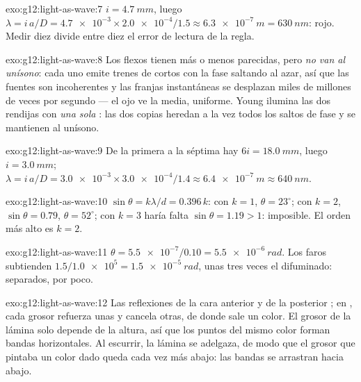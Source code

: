 \begin{solution}{exo:g12:light-as-wave:7}
$i = \qty{4.7}{mm}$, luego
$\lambda = i\,a/D = \num{4.7e-3} \times \num{2.0e-4}/1.5 \approx
\qty{6.3e-7}{m} = \qty{630}{nm}$: rojo. Medir diez  divide
entre diez el error de lectura de la regla.
\end{solution}

\begin{solution}{exo:g12:light-as-wave:8}
Los flexos tienen  más o menos parecidas, pero \emph{no van
al unísono}: cada uno emite trenes de  cortos con la fase saltando
al azar, así que las fuentes son incoherentes y las franjas instantáneas
se desplazan miles de millones de veces por segundo --- el ojo ve la
media, uniforme. Young ilumina las dos rendijas con \emph{una sola}
: las dos copias heredan a la vez todos los saltos de fase y se
mantienen al unísono.
\end{solution}

\begin{solution}{exo:g12:light-as-wave:9}
De la primera a la séptima hay $6i = \qty{18.0}{mm}$, luego
$i = \qty{3.0}{mm}$;
$\lambda = i\,a/D = \num{3.0e-3} \times \num{3.0e-4}/1.4 \approx
\qty{6.4e-7}{m} \approx \qty{640}{nm}$.
\end{solution}

\begin{solution}{exo:g12:light-as-wave:10}
$\sin\theta = k\lambda/d = 0.396\,k$: con $k = 1$,
$\theta = 23^\circ$; con $k = 2$, $\sin\theta = 0.79$,
$\theta = 52^\circ$; con $k = 3$ haría falta $\sin\theta = 1.19 > 1$:
imposible. El orden más alto es $k = 2$.
\end{solution}

\begin{solution}{exo:g12:light-as-wave:11}
$\theta = \num{5.5e-7}/0.10 = \qty{5.5e-6}{rad}$. Los faros subtienden
$1.5/\num{1.0e5} = \qty{1.5e-5}{rad}$, unas tres veces el difuminado:
separados, por poco.
\end{solution}

\begin{solution}{exo:g12:light-as-wave:12}
Las reflexiones de la cara anterior y de la posterior ; en
, cada grosor refuerza unas  y cancela
otras, de donde sale un color. El grosor de la lámina solo depende de la
altura, así que los puntos del mismo color forman bandas horizontales.
Al escurrir, la lámina se adelgaza, de modo que el grosor que pintaba un
color dado queda cada vez más abajo: las bandas se arrastran hacia
abajo.
\end{solution}

